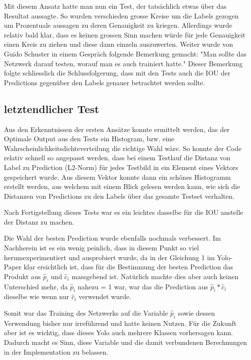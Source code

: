 Mit diesem Ansatz hatte man nun ein Test, der tatsächlich etwas über das Resultat aussagte. 
So wurden verschieden grosse Kreise um die Labels gezogen um Prozentuale aussagen zu deren Genauigkeit zu kriegen.
Allerdings wurde relativ bald klar, dass es keinen grossen Sinn machen würde für jede Genauigkeit einen Kreis zu ziehen und diese dann einzeln auszuwerten.
Weiter wurde von Guido Schuster \cite{PrivateCommunication} in einem Gespräch folgende Bemerkung gemacht:
"Man sollte das Netzwerk darauf testen, worauf man es auch trainiert hatte."
Dieser Bemerkung folgte schliesslich die Schlussfolgerung, dass mit den Tests auch die IOU der Predictions gegenüber den Labels genauer betrachtet werden sollte.

\subsection{letztendlicher Test}
\label{chapter:letztendlicher_test}
Aus den Erkenntnissen der ersten Ansätze konnte ermittelt werden, das der Optimale Output aus den Tests ein Histogram, bzw. eine Wahrscheinlichkeitsdichteverteilung die richtige Wahl wäre.
So konnte der Code relativ schnell so angepasst werden, dass bei einem Testlauf die Distanz von Label zu Prediction (L2-Norm) für jedes Testbild in ein Element eines Vektors gespeichert wurde.
Aus diesem Vektor konnte dann ein schönes Histogramm erstellt werden, aus welchem mit einem Blick gelesen werden kann, wie sich die Distanzen von Predictions zu den Labels über das gesamte Testset verhalten.

Nach Fertigstellung dieses Tests war es ein leichtes dasselbe für die IOU anstelle der Distanz zu machen. 

Die Wahl der besten Prediction wurde ebenfalls nochmals verbessert.
Im Nachherein ist es ein wenig peinlich, dass in diesem Punkt so viel herumexperimentiert und ausprobiert wurde, da in der Gleichung 1 im Yolo-Paper \cite{yolo} klar ersichtlich ist, dass für die Bestimmung der besten Prediction das Produkt aus $\hat{p}_i$ und $\hat{c}_i$ massgebend ist.
Natürlich machte dies aber auch keinen Unterschied mehr, da $\hat{p}_i$ nahezu = 1 war, war das die Prediction aus $\hat{p}_i * \hat{c}_i$ dieselbe wie wenn nur $\hat{c}_i$ verwendet wurde.

Somit war das Training des Netzwerks auf die Variable $\hat{p}_i$ sowie dessen Verwendung bisher nur irreführend und hatte keinen Nutzen.
Für die Zukunft aber ist es wichtig, dass dieses Yolo auch mehrere Klassen vorhersagen kann.
Dadurch macht es Sinn, diese Variable und die damit verbundenen Berechnungen in der Implementation zu belassen. 

